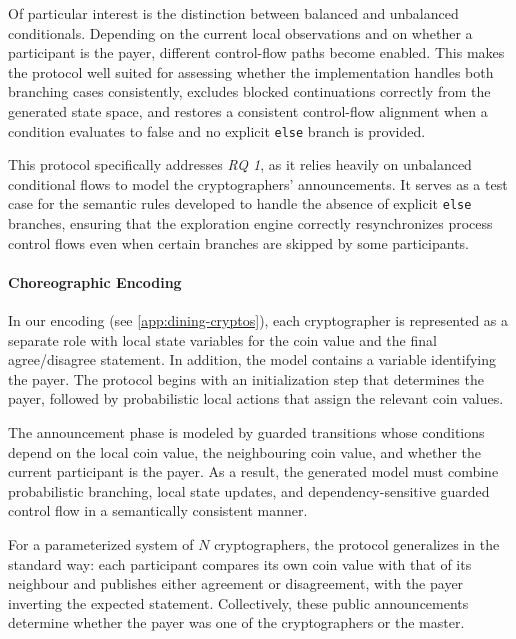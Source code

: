 Of particular interest is the distinction between balanced and unbalanced conditionals. Depending on the current local observations and on whether a participant is the payer, different control-flow paths become enabled. This makes the protocol well suited for assessing whether the implementation handles both branching cases consistently, excludes blocked continuations correctly from the generated state space, and restores a consistent control-flow alignment when a condition evaluates to false and no explicit \texttt{else} branch is provided.

This protocol specifically addresses \textit{RQ 1}, as it relies heavily on unbalanced conditional flows to model the cryptographers' announcements. It serves as a test case for the semantic rules developed to handle the absence of explicit \texttt{else} branches, ensuring that the exploration engine correctly resynchronizes process control flows even when certain branches are skipped by some participants.

\paragraph{Choreographic Encoding}
In our encoding (see \cref{app:dining-cryptos}), each cryptographer is represented as a separate role with local state variables for the coin value and the final agree/disagree statement. In addition, the model contains a variable identifying the payer. The protocol begins with an initialization step that determines the payer, followed by probabilistic local actions that assign the relevant coin values.

The announcement phase is modeled by guarded transitions whose conditions depend on the local coin value, the neighbouring coin value, and whether the current participant is the payer. As a result, the generated model must combine probabilistic branching, local state updates, and dependency-sensitive guarded control flow in a semantically consistent manner.

For a parameterized system of $N$ cryptographers, the protocol generalizes in the standard way: each participant compares its own coin value with that of its neighbour and publishes either agreement or disagreement, with the payer inverting the expected statement. Collectively, these public announcements determine whether the payer was one of the cryptographers or the master.

